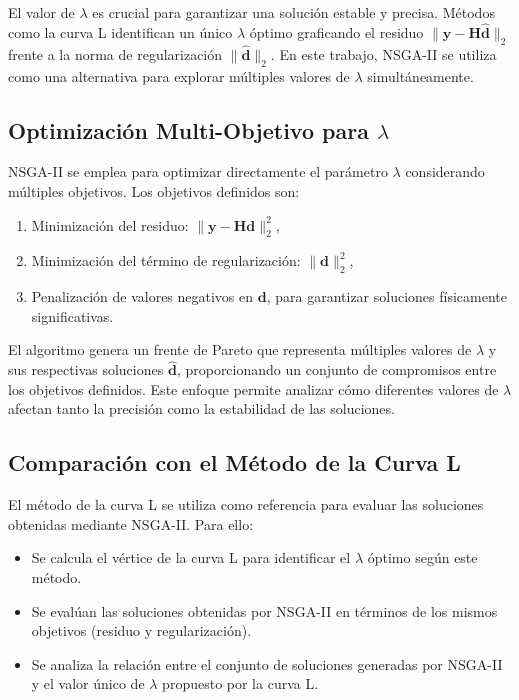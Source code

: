 El valor de \( \lambda \) es crucial para garantizar una solución estable y precisa. Métodos como la curva L identifican un único \( \lambda \) óptimo graficando el residuo \( \| \mathbf{y} - \mathbf{H} \hat{\mathbf{d}} \|_2 \) frente a la norma de regularización \( \| \hat{\mathbf{d}} \|_2 \). En este trabajo, NSGA-II se utiliza como una alternativa para explorar múltiples valores de \( \lambda \) simultáneamente.

\subsection{Optimización Multi-Objetivo para \( \lambda \)} \label{sec:method:nsga}

NSGA-II se emplea para optimizar directamente el parámetro \( \lambda \) considerando múltiples objetivos. Los objetivos definidos son:
\begin{enumerate}
    \item Minimización del residuo: \( \| \mathbf{y} - \mathbf{H} \mathbf{d} \|_2^2 \),
    \item Minimización del término de regularización: \( \| \mathbf{d} \|_2^2 \),
    \item Penalización de valores negativos en \( \mathbf{d} \), para garantizar soluciones físicamente significativas.
\end{enumerate}

El algoritmo genera un frente de Pareto que representa múltiples valores de \( \lambda \) y sus respectivas soluciones \( \hat{\mathbf{d}} \), proporcionando un conjunto de compromisos entre los objetivos definidos. Este enfoque permite analizar cómo diferentes valores de \( \lambda \) afectan tanto la precisión como la estabilidad de las soluciones.

\subsection{Comparación con el Método de la Curva L} \label{sec:method:comparison}

El método de la curva L se utiliza como referencia para evaluar las soluciones obtenidas mediante NSGA-II. Para ello:
\begin{itemize}
    \item Se calcula el vértice de la curva L para identificar el \( \lambda \) óptimo según este método.
    \item Se evalúan las soluciones obtenidas por NSGA-II en términos de los mismos objetivos (residuo y regularización).
    \item Se analiza la relación entre el conjunto de soluciones generadas por NSGA-II y el valor único de \( \lambda \) propuesto por la curva L.
\end{itemize}

